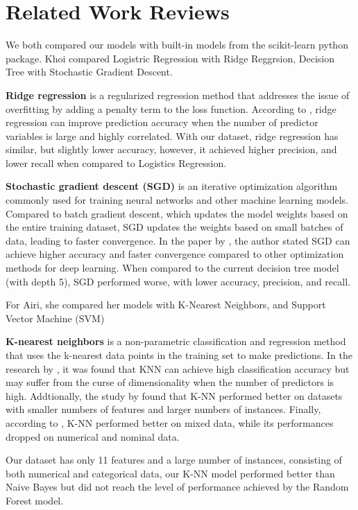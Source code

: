 \section{Related Work Reviews}

We both compared our models with built-in models from the scikit-learn python package. Khoi compared Logistric Regression with Ridge Reggrsion, Decision Tree with Stochastic Gradient Descent.

\textbf{Ridge regression} is a regularized regression method that addresses the issue of overfitting by adding a penalty term to the loss function. According to \cite{hastie2009elements}, ridge regression can improve prediction accuracy when the number of predictor variables is large and highly correlated. With our dataset, ridge regression has similar, but slightly lower accuracy, however, it achieved higher precision, and lower recall when compared to Logistics Regression.

\textbf{Stochastic gradient descent (SGD)} is an iterative optimization algorithm commonly used for training neural networks and other machine learning models. Compared to batch gradient descent, which updates the model weights based on the entire training dataset, SGD updates the weights based on small batches of data, leading to faster convergence. In the paper by \cite{zhang2017understanding}, the author stated SGD can achieve higher accuracy and faster convergence compared to other optimization methods for deep learning. When compared to the current decision tree model (with depth 5), SGD performed worse, with lower accuracy, precision, and recall.

For Airi, she compared her models with K-Nearest Neighbors, and Support Vector Machine (SVM)

\textbf{K-nearest neighbors} is a non-parametric classification and regression method that uses the k-nearest data points in the training set to make predictions. In the research by \cite{cover1967nearest}, it was found that KNN can achieve high classification accuracy but may suffer from the curse of dimensionality when the number of predictors is high. Addtionally, the study by \cite{jadhav2016comparative} found that K-NN performed better on datasets with smaller numbers of features and larger numbers of instances. Finally, according to \cite{singh2017impact}, K-NN performed better on mixed data, while its performances dropped on numerical and nominal data.

Our dataset has only 11 features and a large number of instances, consisting of both numerical and categorical data, our K-NN model performed better than Naive Bayes but did not reach the level of performance achieved by the Random Forest model.

